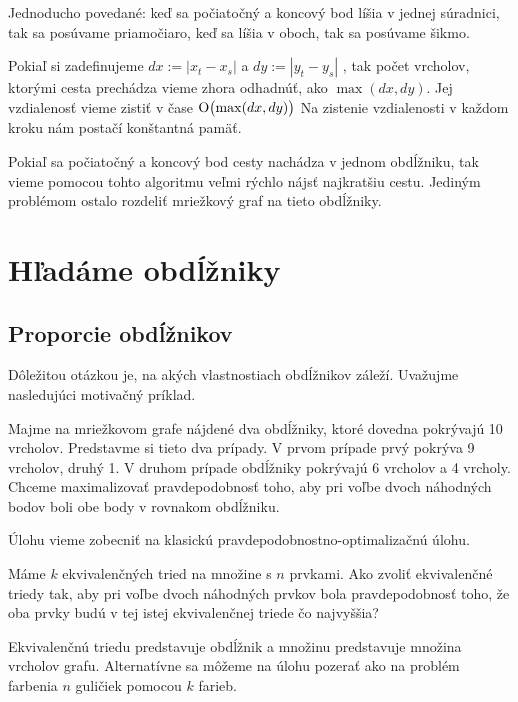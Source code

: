 Jednoducho povedané: keď sa počiatočný a koncový bod líšia v jednej súradnici, tak sa posúvame priamočiaro,
keď sa líšia v oboch, tak sa posúvame šikmo.


Pokiaľ si zadefinujeme 
$ dx := |x_t - x_s|$ 
a
$ dy :=|y_t - y_s| $
 , tak počet vrcholov,
ktorými cesta prechádza vieme zhora odhadnúť, ako $\max(dx, dy)$. Jej vzdialenosť vieme zistiť v čase  $\operatorname{O}\bigl(\max(dx, dy)\bigr)$
Na zistenie vzdialenosti v každom kroku nám postačí konštantná pamäť.


Pokiaľ sa počiatočný a koncový bod cesty nachádza v jednom obdĺžniku, tak vieme pomocou tohto algoritmu veľmi rýchlo nájsť najkratšiu cestu.
Jediným problémom ostalo rozdeliť mriežkový graf na tieto obdĺžniky. 


\section{Hľadáme obdĺžniky}


\subsection{Proporcie obdĺžnikov}
Dôležitou otázkou je, na akých vlastnostiach obdĺžnikov záleží. Uvažujme nasledujúci motivačný príklad.
\begin{example}
Majme na mriežkovom grafe nájdené dva obdĺžniky, ktoré dovedna pokrývajú 10 vrcholov.
Predstavme si tieto dva prípady. V prvom prípade prvý pokrýva 9 vrcholov, druhý 1. V druhom prípade obdĺžniky pokrývajú 6 vrcholov a 4 vrcholy.
Chceme maximalizovať pravdepodobnosť toho, aby pri voľbe dvoch náhodných bodov boli obe body v rovnakom obdĺžniku.
\end{example}

Úlohu vieme zobecniť na klasickú pravdepodobnostno-optimalizačnú úlohu.

\begin{example}
Máme $k$ ekvivalenčných tried na množine s $n$ prvkami. Ako zvoliť ekvivalenčné triedy tak, 
aby pri voľbe dvoch náhodných prvkov bola pravdepodobnosť toho, 
že oba prvky budú v tej istej ekvivalenčnej triede čo najvyššia?
\end{example}

\begin{note}
Ekvivalenčnú triedu predstavuje obdĺžnik a množinu predstavuje množina vrcholov grafu.
Alternatívne sa môžeme na úlohu pozerať ako na problém farbenia $n$ guličiek pomocou $k$ farieb.
\end{note}


